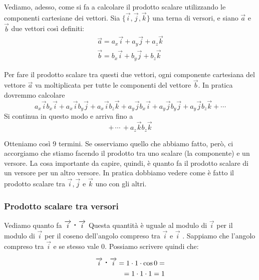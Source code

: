 \documentclass[a4paper]{book}
\newcommand{\prodscal}{\text{\large{\textbf{\textperiodcentered}}}} %
\begin{document}
Vediamo, adesso, come si fa a calcolare il prodotto scalare utilizzando le componenti cartesiane dei vettori.
Sia $\lbrace \overrightarrow{i},  \overrightarrow{j}, \overrightarrow{k} \rbrace $ una terna di versori, e siano $\overrightarrow{a}$ e $ \overrightarrow{b} $ due vettori così definiti:
\begin{align*}
 \overrightarrow{a} = a_{x} \overrightarrow{i} + a_{y} \overrightarrow{j} + a_{z} \overrightarrow{k} \\
 \overrightarrow{b} = b_{x} \overrightarrow{i} + b_{y} \overrightarrow{j} + b_{z} \overrightarrow{k}
 \end{align*} 
 
Per fare il prodotto scalare tra questi due vettori, ogni componente cartesiana del vettore $ \overrightarrow{a} $ va moltiplicata per tutte le componenti del vettore $\overrightarrow{b} $. In pratica dovremmo calcolare
$$ a_{x} \overrightarrow{i} b_{x}\overrightarrow{i} + a_{x} \overrightarrow{i} b_{y}\overrightarrow{j} + a_{x} \overrightarrow{i} b_{z}\overrightarrow{k} + a_{y} \overrightarrow{j} b_{x}\overrightarrow{i} + a_{y} \overrightarrow{j} b_{y}\overrightarrow{j} + a_{y} \overrightarrow{j} b_{z}\overrightarrow{k} + \cdots  $$
Si continua in questo modo e  arriva fino a
$$ + \,  \cdots \, + a_{z} \overrightarrow{k} b_{z} \overrightarrow{k} $$

Otteniamo così 9 termini. Se osserviamo quello che abbiamo fatto, però, ci accorgiamo che stiamo facendo il prodotto tra uno scalare (la componente) e un versore. La cosa importante da capire, quindi, è quanto fa il prodotto scalare di un versore per un altro versore. In pratica dobbiamo vedere come è fatto il prodotto scalare tra $\overrightarrow{i},  \overrightarrow{j}$ e $\overrightarrow{k}$ uno con gli altri.

\subsubsection{Prodotto scalare tra versori}
Vediamo quanto fa $\overrightarrow{i} \prodscal \overrightarrow{i} $
Questa quantità è uguale al modulo di $\overrightarrow{i}$ per il modulo di $\overrightarrow{i} $ per il coseno dell'angolo compreso tra $ \overrightarrow{i} $ e $\overrightarrow{i}$ .
Sappiamo che l'angolo compreso tra $ \overrightarrow{i} $ e se stesso vale 0. Possiamo scrivere quindi che:

\begin{align*}
\overrightarrow{i} \prodscal \overrightarrow{i} = 1 \cdot 1 \cdot \cos 0 = \\
= 1 \cdot 1 \cdot 1 = 1 
\end{align*}
\end{document}
